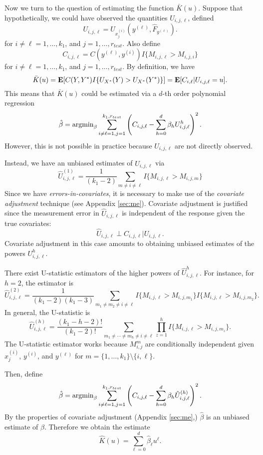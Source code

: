 \documentclass[12pt]{article}
\begin{document}
Now we turn to the question of estimating the function $\bar{K}(u)$.
Suppose that hypothetically, we could have observed the quantities
$U_{i, j, \ell}$, defined
\[
U_{i, j, \ell} = U_{x_j^{(i)}}(y^{(\ell)}, \hat{F}_{y^{(\ell)}}).
\]
for $i \neq \ell = 1,\hdots, k_1$, and $j = 1,\hdots, r_{test}$.
Also define
\[
C_{i,j, \ell} = C(y^{(\ell)}, y^{(i)})I\{M_{i, j, \ell} > M_{i, j, i}\}
\]
for $i \neq \ell = 1,\hdots, k_1$, and $j = 1,\hdots, r_{test}$.
By definition, we have
\[
\bar{K}(u) = \textbf{E}[C(Y, Y^*)I\{U_{X^*}(Y) > U_{X^*}(Y^*)\}] = \textbf{E}[C_{i,\ell} | U_{i, j, \ell} = u].
\]
This means that $\bar{K}(u)$ could be estimated via a $d$-th order polynomial regression
\[
\hat{\beta} = \text{argmin}_{\beta} \sum_{i\neq \ell=1, j = 1}^{k_1, r_{test}} \left(C_{i,j,\ell} - \sum_{h=0}^d \beta_h U_{i,j, \ell}^h\right)^2.
\]
However, this is not possible in
practice because $U_{i,j,\ell}$ are not directly observed.

Instead, we have an unbiased estimates of $\hat{U}_{i, j, \ell}$ via
\[
\hat{U}_{i,j, \ell}^{(1)} = \frac{1}{(k_1-2)}\sum_{m \neq i \neq \ell} I\{M_{i, j, \ell} > M_{i, j, m}\}
\]
Since we have \emph{errors-in-covariates}, it is necessary to make use
of the \emph{covariate adjustment} technique (see
Appendix \ref{sec:me}).  Covariate adjustment is justified since the
measurement error in $\hat{U}_{i,j, \ell}$ is independent of the
response given the true covariates:
\[
\hat{U}_{i,j,\ell} \perp C_{i,j,\ell} | U_{i, j,\ell}.
\]
Covariate adjustment in this case amounts to obtaining unbiased estimates of
the powers $U_{i,j,\ell}^h$.

There exist U-statistic estimators of the higher powers of
$\hat{U}_{i,j,\ell}^h$.  For instance, for $h=2$, the estimator is
\[
\hat{U}_{i,j,\ell}^{(2)} = \frac{1}{ (k_1-2)(k_1-3) } \sum_{m_1\neq m_2 \neq i \neq \ell} I\{M_{i, j, \ell} > M_{i, j, m_1}\} I\{M_{i, j, \ell} > M_{i, j, m_2}\}.
\]
In general, the U-statistic is
\[
\hat{U}_{i, j, \ell}^{(h)} = \frac{(k_1-h-2)!}{(k_1-2)!} \sum_{m_1 \neq \cdots \neq m_h \neq i \neq \ell} \prod_{z=1}^h I\{M_{i, j, \ell} > M_{i, j, m_z}\}.
\]
The U-statistic estimator works because $M_{i, j}^m$ are conditionally
independent given $x^{(i)}_j$, $y^{(i)}$, and $y^{(\ell)}$ for $m
= \{1,\hdots, k_1\}\setminus \{i, \ell\}$.

Then, define
\[
\hat{\beta} = \text{argmin}_\beta \sum_{i\neq \ell=1, j = 1}^{k_1, r_{test}} \left(C_{i,j,\ell} - \sum_{h=0}^d \beta_h \hat{U}_{i,j, \ell}^{(h)}\right)^2.
\]
By the properties of covariate adjustment (Appendix \ref{sec:me},) $\hat{\beta}$ is an unbiased estimate of $\beta$.
Therefore we obtain the estimate
\[
\hat{K}(u) = \sum_{\ell = 0}^d \hat{\beta}_\ell u^\ell.
\]
\end{document}
